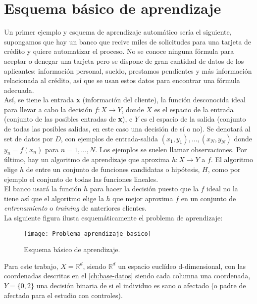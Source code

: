 \section{Esquema básico de aprendizaje}
Un primer ejemplo y esquema de aprendizaje automático sería el siguiente, supongamos que hay un banco que recive miles de solicitudes para una tarjeta de crédito y quiere automatizar el proceso. No se conoce ninguna fórmula para aceptar o denegar una tarjeta pero se dispone de gran cantidad de datos de los aplicantes: información personal, sueldo, prestamos pendientes y más información relacionada al crédito, así que se usan estos datos para encontrar una fórmula adecuada.\\
Así, se tiene la entrada \textbf{x} (información del cliente), la función desconocida ideal para llevar a cabo la decisión $f:X \rightarrow Y$, donde $X$ es el espacio de la entrada (conjunto de las posibles entradas de \textbf{x}), e $Y$ es el espacio de la salida (conjunto de todas las posibles salidas, en este caso una decisión de sí o no). Se denotará al set de datos por $D$, con ejemplos de entrada-salida $(x_{1},y_{1}),...,(x_{N},y_{N})$ donde $y_{n}=f(x_{n})$ para $n=1,...,N$. Los ejemplos se suelen llamar observaciones. Por último, hay un algoritmo de aprendizaje que aproxima $h:X \rightarrow Y$ a $f$.  El algoritmo elige $h$ de entre un conjunto de funciones candidatas o hipótesis, $H$, como por ejemplo el conjunto de todas las funciones lineales.\\
El banco usará la función $h$ para hacer la decisión puesto que la $f$ ideal no la tiene así que el algoritmo elige la $h$ que mejor aproxima $f$ en un conjunto de \textit{entrenamiento} o \textit{training} de anteriores clientes. \cite{abu2012learning}\\
La siguiente figura ilusta esquemáticamente el problema de aprendizaje:
\begin{figure}[H]
  \centering
  \texttt{[image: Problema\_aprendizaje\_basico]}
  \caption{Esquema básico de aprendizaje.}
  \label{fig:k-nn-example}
\end{figure}

Para este trabajo, $X=\mathbb{R}^{d}$, siendo $\mathbb{R}^{d}$ un espacio euclídeo d-dimensional, con las coordenadas descritas en el \autoref{ch:base-datos} siendo cada columna una coordenada, $Y=\lbrace 0,2 \rbrace$ una decisión binaria de si el individuo es sano o afectado (o padre de afectado para el estudio con controles).\\
